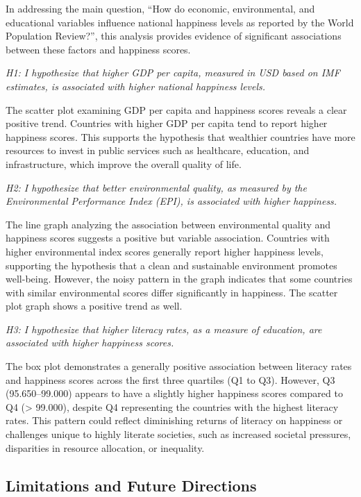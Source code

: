 \documentclass[
]{article}
\begin{document}
In addressing the main question, ``How do economic, environmental, and
educational variables influence national happiness levels as reported by
the World Population Review?'', this analysis provides evidence of
significant associations between these factors and happiness scores.

\emph{H1: I hypothesize that higher GDP per capita, measured in USD
based on IMF estimates, is associated with higher national happiness
levels.}

The scatter plot examining GDP per capita and happiness scores reveals a
clear positive trend. Countries with higher GDP per capita tend to
report higher happiness scores. This supports the hypothesis that
wealthier countries have more resources to invest in public services
such as healthcare, education, and infrastructure, which improve the
overall quality of life.

\emph{H2: I hypothesize that better environmental quality, as measured
by the Environmental Performance Index (EPI), is associated with higher
happiness.}

The line graph analyzing the association between environmental quality
and happiness scores suggests a positive but variable association.
Countries with higher environmental index scores generally report higher
happiness levels, supporting the hypothesis that a clean and sustainable
environment promotes well-being. However, the noisy pattern in the graph
indicates that some countries with similar environmental scores differ
significantly in happiness. The scatter plot graph shows a positive
trend as well.

\emph{H3: I hypothesize that higher literacy rates, as a measure of
education, are associated with higher happiness scores.}

The box plot demonstrates a generally positive association between
literacy rates and happiness scores across the first three quartiles (Q1
to Q3). However, Q3 (95.650--99.000) appears to have a slightly higher
happiness scores compared to Q4 (\textgreater{} 99.000), despite Q4
representing the countries with the highest literacy rates. This pattern
could reflect diminishing returns of literacy on happiness or challenges
unique to highly literate societies, such as increased societal
pressures, disparities in resource allocation, or inequality.

\subsection{Limitations and Future
Directions}\label{limitations-and-future-directions}
\end{document}

